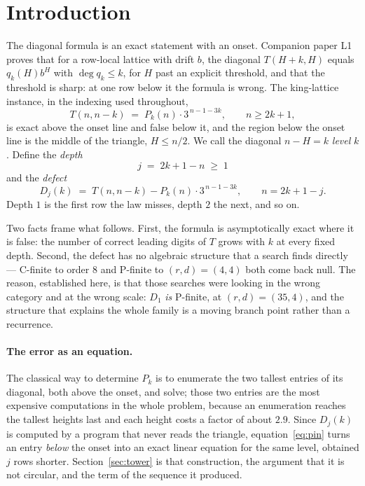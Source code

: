 \documentclass[11pt]{article}
\newcommand{\Dj}{D_j}
\begin{document}
\tableofcontents

\section{Introduction}
\label{sec:intro}

The diagonal formula is an exact statement with an onset. Companion paper L1
proves that for a row-local lattice with drift $b$, the diagonal $T(H+k, H)$
equals $q_k(H)b^H$ with $\deg q_k \le k$, for $H$ past an explicit threshold,
and that the threshold is sharp: at one row below it the formula is wrong.
The king-lattice instance, in the indexing used throughout,
\begin{equation}
  T(n, n-k) \;=\; P_k(n)\cdot 3^{\,n-1-3k}, \qquad n \ge 2k+1,
  \label{eq:law}
\end{equation}
is exact above the onset line and false below it, and the region below the
onset line is the middle of the triangle, $H \le n/2$. We call the diagonal
$n - H = k$ \emph{level} $k$. Define the \emph{depth}
\[
  j \;=\; 2k+1-n \;\ge\; 1
\]
and the \emph{defect}
\[
  D_j(k) \;=\; T(n,n-k) - P_k(n)\cdot 3^{\,n-1-3k}, \qquad n = 2k+1-j .
\]
Depth $1$ is the first row the law misses, depth $2$ the next, and so on.

Two facts frame what follows. First, the formula is asymptotically exact where
it is false: the number of correct leading digits of $T$ grows with $k$ at every
fixed depth. Second, the defect has no algebraic structure that a search finds
directly --- C-finite to order $8$ and P-finite to $(r,d) = (4,4)$ both come back
null. The reason, established here, is that those searches were looking in the
wrong category and at the wrong scale: $D_1$ \emph{is} P-finite, at
$(r,d) = (35,4)$, and the structure that explains the whole family is a moving
branch point rather than a recurrence.

\paragraph{The error as an equation.} The classical way to determine $P_k$ is
to enumerate the two tallest entries of its diagonal, both above the onset, and
solve; those two entries are the most expensive computations in the whole
problem, because an enumeration reaches the tallest heights last and each
height costs a factor of about $2.9$. Since $\Dj(k)$ is computed by a program
that never reads the triangle, equation~\eqref{eq:pin} turns an entry
\emph{below} the onset into an exact linear equation for the same level,
obtained $j$ rows shorter. Section~\ref{sec:tower} is that construction, the
argument that it is not circular, and the term of the sequence it produced.
\end{document}
